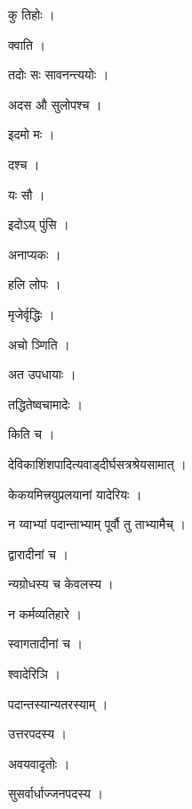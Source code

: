 \documentclass[10pt, openany]{book}
\begin{document}
\noindent कु तिहोः ।

\noindent क्वाति ।

\noindent तदोः सः सावनन्त्ययोः ।

\noindent अदस औ सुलोपश्च ।

\noindent इदमो मः ।

\noindent दश्च ।

\noindent यः सौ ।

\noindent इदोऽय् पुंसि ।

\noindent अनाप्यकः ।

\noindent हलि लोपः ।

\noindent मृजेर्वृद्धिः ।

\noindent अचो ञ्णिति ।

\noindent अत उपधायाः ।

\noindent तद्धितेष्वचामादेः ।

\noindent किति च ।

\noindent देविकाशिंशपादित्यवाड्दीर्घसत्रश्रेयसामात् ।

\noindent केकयमित्त्रयुप्रलयानां यादेरियः ।

\noindent न य्वाभ्यां पदान्ताभ्याम् पूर्वौ तु ताभ्यामैच् ।

\noindent द्वारादीनां च ।

\noindent न्यग्रोधस्य च केवलस्य ।

\noindent न कर्मव्यतिहारे ।

\noindent स्वागतादीनां च ।

\noindent श्वादेरिञि ।

\noindent पदान्तस्यान्यतरस्याम् ।

\noindent उत्तरपदस्य ।

\noindent अवयवादृतोः ।

\noindent सुसर्वार्धाज्जनपदस्य ।
\end{document}
